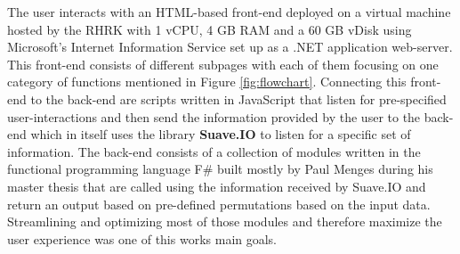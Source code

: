 The user interacts with an HTML-based front-end deployed on a virtual machine hosted by the RHRK with 1 vCPU, 4 GB RAM and a 60 GB vDisk using Microsoft's Internet Information Service set up as a .NET application web-server. This front-end consists of different subpages with each of them focusing on one category of functions mentioned in Figure \ref{fig:flowchart}. Connecting this front-end to the back-end are scripts written in JavaScript that listen for pre-specified user-interactions and then send the information provided by the user to the back-end which in itself uses the library \textbf{Suave.IO} to listen for a specific set of information.
The back-end consists of a collection of modules written in the functional programming language F\# built mostly by Paul Menges during his master thesis \citep{Menges.2018} that are called using the information received by Suave.IO and return an output based on pre-defined permutations based on the input data. Streamlining and optimizing most of those modules and therefore maximize the user experience was one of this works main goals.\newpage
